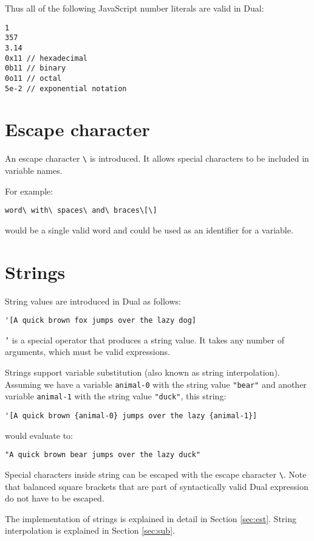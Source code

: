 Thus all of the following JavaScript number literals are valid in Dual:
\begin{lstlisting}
1
357
3.14
0x11 // hexadecimal
0b11 // binary
0o11 // octal
5e-2 // exponential notation
\end{lstlisting}

\section{Escape character}
An escape character \texttt{\textbackslash} is introduced. It allows special characters to be included in variable names.

For example:
\begin{lstlisting}
word\ with\ spaces\ and\ braces\[\]
\end{lstlisting}
would be a single valid word and could be used as an identifier for a variable.

\section{Strings}
String values are introduced in Dual as follows:
\begin{lstlisting}
'[A quick brown fox jumps over the lazy dog]
\end{lstlisting}

\texttt{'} is a special operator that produces a string value. It takes any number of arguments, which must be valid expressions.

Strings support variable substitution (also known as string interpolation\cite{string_interpolation_wikipedia}). Assuming we have a variable \texttt{animal-0} with the string value \texttt{"bear"} and another variable \texttt{animal-1} with the string value \texttt{"duck"}, this string:
\begin{lstlisting}
'[A quick brown {animal-0} jumps over the lazy {animal-1}]
\end{lstlisting}

would evaluate to:
\begin{lstlisting}
"A quick brown bear jumps over the lazy duck"
\end{lstlisting}

Special characters inside string can be escaped with the escape character \texttt{\textbackslash}. Note that balanced square brackets that are part of syntactically valid Dual expression do not have to be escaped.

The implementation of strings is explained in detail in Section \ref{sec:est}. String interpolation is explained in Section \ref{sec:sub}.

